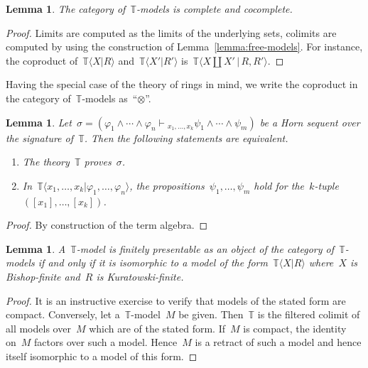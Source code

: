 \documentclass[oneside,reqno]{amsart}
\theoremstyle{definition}
\theoremstyle{plain}
\newtheorem{lemma}[defn]{Lemma}
\theoremstyle{remark}
\newcommand{\TT}{\mathbb{T}}
\renewcommand{\_}{\mathpunct{.}\,}
\newcommand{\?}{\,{:}\,}
\newcommand{\seq}[1]{\mathrel{\vdash\!\!\!_{#1}}}
\begin{document}
\begin{lemma}The category of~$\TT$-models is complete and
cocomplete.\end{lemma}

\begin{proof}Limits are computed as the limits of the underlying sets, colimits
are computed by using the construction of Lemma~\ref{lemma:free-models}. For
instance, the coproduct of~$\TT\langle X | R \rangle$ and~$\TT\langle X' | R'
\rangle$ is~$\TT\langle X \amalg X' \,|\, R, R' \rangle$.\end{proof}

Having the special case of the theory of rings in mind, we write the coproduct
in the category of~$\TT$-models as~``$\otimes$''.

\begin{lemma}Let~$\sigma = (\varphi_1 \wedge \cdots \wedge \varphi_n
\seq{x_1,\ldots,x_k} \psi_1 \wedge \cdots \wedge \psi_m)$ be a Horn sequent
over the signature of~$\TT$. Then the following statements are equivalent.
\begin{enumerate}
\item The theory~$\TT$ proves~$\sigma$.
\item In~$\TT\langle x_1,\ldots,x_k | \varphi_1,\ldots,\varphi_n \rangle$, the
propositions~$\psi_1,\ldots,\psi_m$ hold for
the~$k$-tuple~$([x_1],\ldots,[x_k])$.
\end{enumerate}
\end{lemma}

\begin{proof}By construction of the term algebra.\end{proof}

\begin{lemma}A~$\TT$-model is finitely presentable as an object of the category
of~$\TT$-models if and only if it is isomorphic to a model of the
form~$\TT\langle X | R \rangle$ where~$X$ is Bishop-finite and~$R$ is
Kuratowski-finite.
\end{lemma}

\begin{proof}It is an instructive exercise to verify that models of the stated
form are compact. Conversely, let a~$\TT$-model~$M$ be given. Then~$\TT$ is the
filtered colimit of all models over~$M$ which are of the stated form. If~$M$ is
compact, the identity on~$M$ factors over such a model. Hence~$M$ is a
retract of such a model and hence itself isomorphic to a model of this form.
\end{proof}
\end{document}
